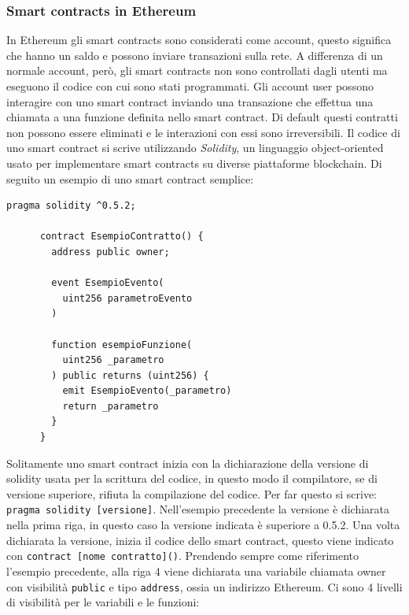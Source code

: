 \documentclass[a4paper]{article}
\begin{document}
    \subsubsection{Smart contracts in Ethereum}
    In Ethereum gli smart contracts sono considerati come account, questo significa che hanno un saldo e possono inviare transazioni sulla rete. A differenza di un normale account, però,
    gli smart contracts non sono controllati dagli utenti ma eseguono il codice con cui sono stati programmati. Gli account user possono interagire con uno smart contract inviando una transazione
    che effettua una chiamata a una funzione definita nello smart contract. Di default questi contratti non possono essere eliminati e le interazioni con essi sono irreversibili.
    \newline
    Il codice di uno smart contract si scrive utilizzando \emph{Solidity}, un linguaggio object-oriented usato per implementare smart contracts su diverse piattaforme blockchain.
    Di seguito un esempio di uno smart contract semplice:
    \begin{lstlisting}[style=ES6, title={Esempio codice di uno smart contract}]
      pragma solidity ^0.5.2;

      contract EsempioContratto() {
        address public owner;
        
        event EsempioEvento(
          uint256 parametroEvento
        )

        function esempioFunzione(
          uint256 _parametro
        ) public returns (uint256) {
          emit EsempioEvento(_parametro)
          return _parametro
        }
      }\end{lstlisting}
      Solitamente uno smart contract inizia con la dichiarazione della versione di solidity usata per la scrittura del codice, in questo modo il compilatore, se di versione superiore, rifiuta la compilazione del codice.
      Per far questo si scrive: \newline \verb|pragma solidity [versione]|. Nell'esempio precedente la versione è dichiarata nella prima riga, in questo caso la versione indicata è superiore a 0.5.2.
      \newline
      Una volta dichiarata la versione, inizia il codice dello smart contract, questo viene indicato con \verb|contract [nome contratto]()|. Prendendo sempre come riferimento l'esempio precedente,
      alla riga 4 viene dichiarata una variabile chiamata owner con visibilità \verb|public| e tipo \verb|address|, ossia un indirizzo Ethereum. Ci sono 4 livelli di visibilità per le variabili e le funzioni:
\end{document}
